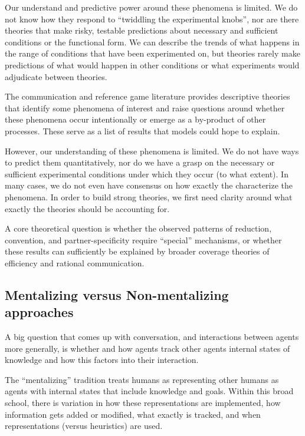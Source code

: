 \documentclass[]{article}
\begin{document}
Our understand and predictive power around these phenomena is limited. We do not know how they respond to ``twiddling the experimental knobs'', nor are there theories that make risky, testable predictions about necessary and sufficient conditions or the functional form.  We can describe the trends of what happens in the range of conditions that have been experimented on, but theories rarely make predictions of what would happen in other conditions or what experiments would adjudicate between theories. 

The communication and reference game literature provides descriptive theories that identify some phenomena of interest and raise questions around whether these phenomena occur intentionally or emerge as a by-product of other processes. These serve as a list of results that models could hope to explain. 

However, our understanding of these phenomena is limited. We do not have ways to predict them quantitatively, nor do we have a grasp on the necessary or sufficient experimental conditions under which they occur (to what extent). In many cases, we do not even have consensus on how exactly the characterize the phenomena. In order to build strong theories, we first need clarity around what exactly the theories should be accounting for. 

A core theoretical question is whether the observed patterns of reduction, convention, and partner-specificity require ``special'' mechanisms, or whether these results can sufficiently be explained by broader coverage theories of efficiency and rational communication.

\subsection{Mentalizing versus Non-mentalizing approaches}

A big question that comes up with conversation, and interactions between agents more generally, is whether and how agents track other agents internal states of knowledge and how this factors into their interaction.



The ``mentalizing'' tradition treats humans as representing other humans as agents with internal states that include knowledge and goals.  Within this broad school, there is variation in how these representations are implemented, how information gets added or modified, what exactly is tracked, and when representations (versus heuristics) are used. 
\end{document}
